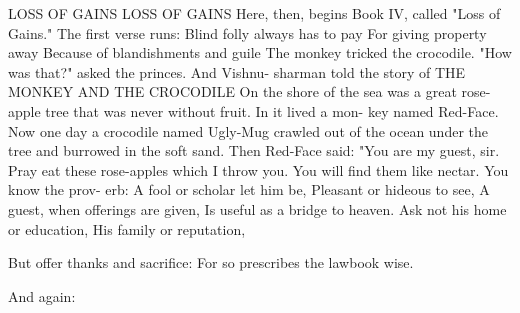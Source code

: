 \documentclass{book}
\begin{document}
LOSS OF GAINS
LOSS OF GAINS
Here, then, begins Book IV, called "Loss of
Gains." The first verse runs:
Blind folly always has to pay
For giving property away
Because of blandishments and guile
The monkey tricked the crocodile.
"How was that?" asked the princes.   And Vishnu-
sharman told the story of
THE MONKEY AND THE CROCODILE
On the shore of the sea was a great rose-apple
tree that was never without fruit. In it lived a mon-
key named Red-Face.
Now one day a crocodile named Ugly-Mug crawled
out of the ocean under the tree and burrowed in the
soft sand. Then Red-Face said: "You are my guest,
sir. Pray eat these rose-apples which I throw you.
You will find them like nectar. You know the prov-
erb:
A fool or scholar let him be,
Pleasant or hideous to see,
A guest, when offerings are given,
Is useful as a bridge to heaven.
Ask not his home or education,
His family or reputation,

But offer thanks and sacrifice:
For so prescribes the lawbook wise.

And again:
\end{document}
